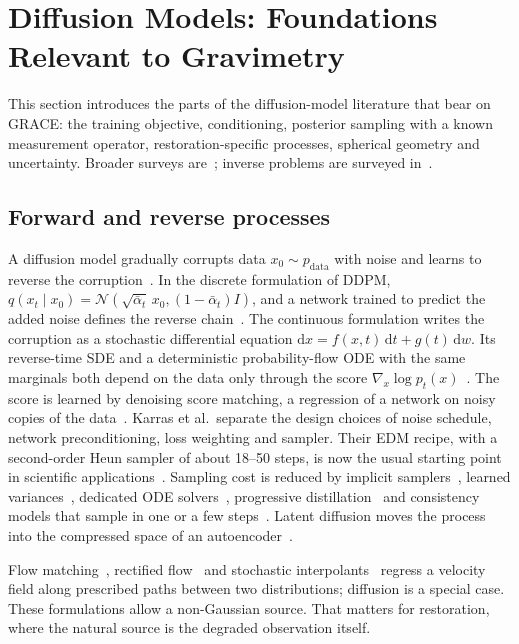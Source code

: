 \section{Diffusion Models: Foundations Relevant to Gravimetry}
\label{sec:diffusion}

This section introduces the parts of the diffusion-model literature that bear on GRACE: the training objective, conditioning, posterior sampling with a known measurement operator, restoration-specific processes, spherical geometry and uncertainty. Broader surveys are~\cite{yang2023survey,croitoru2023survey}; inverse problems are surveyed in~\cite{daras2024survey}.

\subsection{Forward and reverse processes}

A diffusion model gradually corrupts data $x_0 \sim p_\mathrm{data}$ with noise and learns to reverse the corruption~\cite{sohldickstein2015deep}. In the discrete formulation of DDPM, $q(x_t \mid x_0) = \mathcal{N}(\sqrt{\bar\alpha_t}\,x_0, (1-\bar\alpha_t) I)$, and a network trained to predict the added noise defines the reverse chain~\cite{ho2020ddpm}. The continuous formulation writes the corruption as a stochastic differential equation $\mathrm{d}x = f(x,t)\,\mathrm{d}t + g(t)\,\mathrm{d}w$. Its reverse-time SDE and a deterministic probability-flow ODE with the same marginals both depend on the data only through the score $\nabla_x \log p_t(x)$~\cite{song2021scoresde}. The score is learned by denoising score matching, a regression of a network on noisy copies of the data~\cite{hyvarinen2005score,song2019ncsn}. Karras et al.\ separate the design choices of noise schedule, network preconditioning, loss weighting and sampler. Their EDM recipe, with a second-order Heun sampler of about 18--50 steps, is now the usual starting point in scientific applications~\cite{karras2022edm,mardani2025corrdiff,price2025gencast}. Sampling cost is reduced by implicit samplers~\cite{song2021ddim}, learned variances~\cite{nichol2021improved}, dedicated ODE solvers~\cite{lu2022dpmsolver}, progressive distillation~\cite{salimans2022progressive} and consistency models that sample in one or a few steps~\cite{song2023consistency}. Latent diffusion moves the process into the compressed space of an autoencoder~\cite{rombach2022ldm}.

Flow matching~\cite{lipman2023flow}, rectified flow~\cite{liu2023rectified} and stochastic interpolants~\cite{albergo2023interpolants} regress a velocity field along prescribed paths between two distributions; diffusion is a special case. These formulations allow a non-Gaussian source. That matters for restoration, where the natural source is the degraded observation itself.


